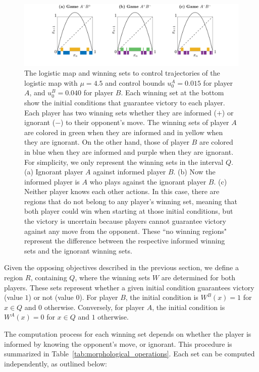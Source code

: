 \begin{figure}[h!]
    \centering
   \includegraphics[trim={3.2cm 0cm 0cm 0cm}, clip,width=1.1\textwidth ]{Images/P5/sets_juego.png}
    \caption{The logistic map and winning sets to control trajectories of the logistic map with $\mu = 4.5$ and control bounds $u^A_0 = 0.015$ for player $A$, and $u^B_0 = 0.040$ for player $B$. Each winning set at the bottom show the initial conditions that guarantee victory to each player. Each player has two winning sets whether they are informed ($+$) or ignorant ($-$) to their opponent's move. The winning sets of player $A$ are colored in green when they are informed and in yellow when they are ignorant. On the other hand, those of player $B$ are colored in blue when they are informed and purple when they are ignorant. For simplicity, we only represent the winning sets in the interval $Q$. (a) Ignorant player $A$ against informed player $B$. (b) Now the informed player is $A$ who plays against the ignorant player $B$. (c) Neither player knows each other actions. In this case, there are regions that do not belong to any player's winning set, meaning that both player could win when starting at those initial conditions, but the victory is uncertain because players cannot guarantee victory against any move from the opponent. These ``no winning regions" represent the difference between the respective informed winning sets and the ignorant winning sets.}
    \label{fig::sets}
\end{figure}




Given the opposing objectives described in the previous section, we define a region $R$, containing $Q$, where the winning sets $W$ are determined for both players. These sets represent whether a given initial condition guarantees victory (value $1$) or not (value $0$). For player $B$, the initial condition is $W^B(x) = 1$ for $x \in Q$ and $0$ otherwise. Conversely, for player $A$, the initial condition is $W^A(x) = 0$ for $x \in Q$ and $1$ otherwise.  

The computation process for each winning set depends on whether the player is informed by knowing the opponent's move, or ignorant. This procedure is summarized in Table~\ref{tab:morphological_operations}. Each set can be computed independently, as outlined below:  

